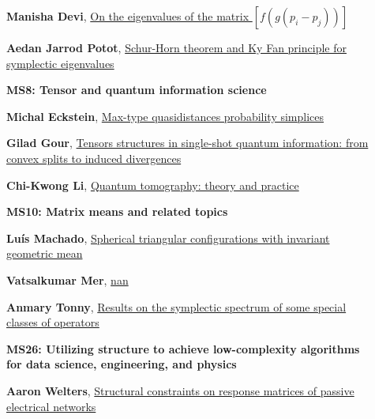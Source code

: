 \documentclass[ILAS2025-program.tex]{subfiles}
\begin{document}
\begin{description}
\begin{description}
        \item[] \hypertarget{up0047}{}\textbf{Manisha Devi}, \hyperlink{down0047}{On the eigenvalues of the matrix $[f(g(p_i-p_j))]$}
        \item[] \hypertarget{up0048}{}\textbf{Aedan Jarrod Potot}, \hyperlink{down0048}{Schur-Horn theorem and Ky Fan principle for symplectic eigenvalues
}
        \end{description}
    \begin{description}
    \item[] {\color{mstitle}\textbf{MS8: Tensor and quantum information science}} 
    \item[] \hypertarget{up0052}{}\textbf{Michal Eckstein}, \hyperlink{down0052}{Max-type quasidistances probability simplices}
        \item[] \hypertarget{up0053}{}\textbf{Gilad Gour}, \hyperlink{down0053}{Tensors structures in single-shot quantum information: from convex splits to induced divergences}
        \item[] \hypertarget{up0054}{}\textbf{Chi-Kwong Li}, \hyperlink{down0054}{Quantum tomography: theory and practice
}
        \end{description}
    \begin{description}
    \item[] {\color{mstitle}\textbf{MS10: Matrix means and related topics}} 
    \item[] \hypertarget{up0055}{}\textbf{Luís Machado}, \hyperlink{down0055}{Spherical triangular configurations with invariant geometric mean}
        \item[] \hypertarget{up0056}{}\textbf{Vatsalkumar Mer}, \hyperlink{down0056}{nan}
        \item[] \hypertarget{up0057}{}\textbf{Anmary Tonny}, \hyperlink{down0057}{Results on the symplectic spectrum of some special classes of operators}
        \end{description}
    \begin{description}
    \item[] {\color{mstitle}\textbf{MS26: Utilizing structure to achieve low-complexity algorithms for data science, engineering, and physics}} 
    \item[] \hypertarget{up0058}{}\textbf{Aaron Welters}, \hyperlink{down0058}{Structural constraints on response matrices of passive electrical networks
}
\end{description}
\end{description}
\end{document}
